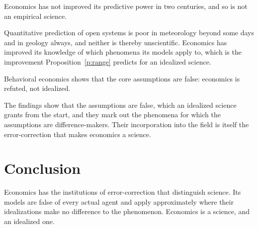 \documentclass{situationist-preprint}
\begin{document}
\begin{objection}[Rosenberg]
Economics has not improved its predictive power in two centuries, and so is not an empirical science.
\end{objection}

\begin{reply}
Quantitative prediction of open systems is poor in meteorology beyond some days and in geology always, and neither is thereby unscientific. Economics has improved its knowledge of which phenomena its models apply to, which is the improvement Proposition~\ref{p:range} predicts for an idealized science.
\end{reply}

\begin{objection}
Behavioral economics shows that the core assumptions are false: economics is refuted, not idealized.
\end{objection}

\begin{reply}
The findings show that the assumptions are false, which an idealized science grants from the start, and they mark out the phenomena for which the assumptions are difference-makers. Their incorporation into the field is itself the error-correction that makes economics a science.
\end{reply}

\section{Conclusion}

Economics has the institutions of error-correction that distinguish science. Its models are false of every actual agent and apply approximately where their idealizations make no difference to the phenomenon. Economics is a science, and an idealized one.
\end{document}
